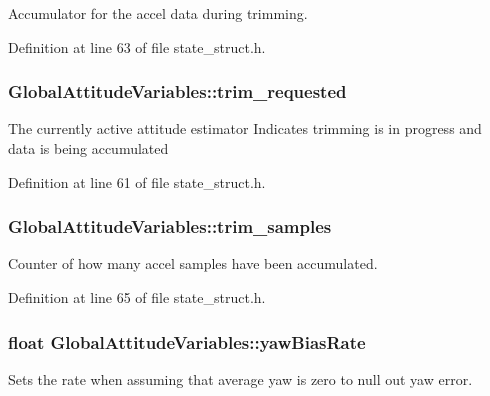 Accumulator for the accel data during trimming. 



Definition at line 63 of file state\-\_\-struct.\-h.

\hypertarget{group___state_ga1b90881e0b0eb5aa9cf39d0ba8ef5e0d}{
\subsubsection[{trim\-\_\-requested}]{ Global\-Attitude\-Variables\-::trim\-\_\-requested}}\label{group___state_ga1b90881e0b0eb5aa9cf39d0ba8ef5e0d}
The currently active attitude estimator Indicates trimming is in progress and data is being accumulated 

Definition at line 61 of file state\-\_\-struct.\-h.

\hypertarget{group___state_ga9e5b2790cd84db83278b3c8c289ea411}{
\subsubsection[{trim\-\_\-samples}]{ Global\-Attitude\-Variables\-::trim\-\_\-samples}}\label{group___state_ga9e5b2790cd84db83278b3c8c289ea411}


Counter of how many accel samples have been accumulated. 



Definition at line 65 of file state\-\_\-struct.\-h.

\hypertarget{group___state_ga0c53c008608a5724b2d563fd5b560905}{
\subsubsection[{yaw\-Bias\-Rate}]{\setlength{\rightskip}{0pt plus 5cm}float Global\-Attitude\-Variables\-::yaw\-Bias\-Rate}}\label{group___state_ga0c53c008608a5724b2d563fd5b560905}


Sets the rate when assuming that average yaw is zero to null out yaw error. 



